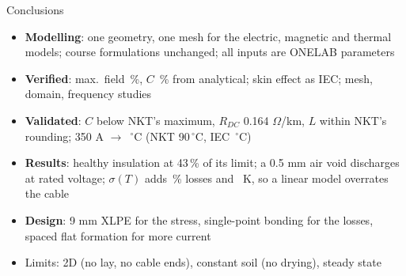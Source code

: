 \documentclass[aspectratio=169,10pt]{beamer}
\begin{document}
\begin{frame}{Conclusions}
\small
\begin{itemize}
\item \textbf{Modelling}: one geometry, one mesh for the electric, magnetic and thermal models; course formulations unchanged; all inputs are ONELAB parameters
\item \textbf{Verified}: max.\ field \dEfine\,\%, $C$ \dCana\,\% from analytical; skin effect as IEC; mesh, domain, frequency studies
\item \textbf{Validated}: $C$ below NKT's maximum, $R_{DC}$ 0.164 $\Omega$/km, $L$ within NKT's rounding; 350 A $\rightarrow$ \Tcnl\,$^\circ$C (NKT 90\,$^\circ$C, IEC \IecTheta\,$^\circ$C)
\item \textbf{Results}: healthy insulation at 43\,\% of its limit; a 0.5 mm air void discharges at rated voltage; $\sigma(T)$ adds \dPtNL\,\% losses and \dTcNL\ K, so a linear model overrates the cable
\item \textbf{Design}: 9 mm XLPE for the stress, single-point bonding for the losses, spaced flat formation for more current
\item Limits: 2D (no lay, no cable ends), constant soil (no drying), steady state
\end{itemize}
\end{frame}
\end{document}
